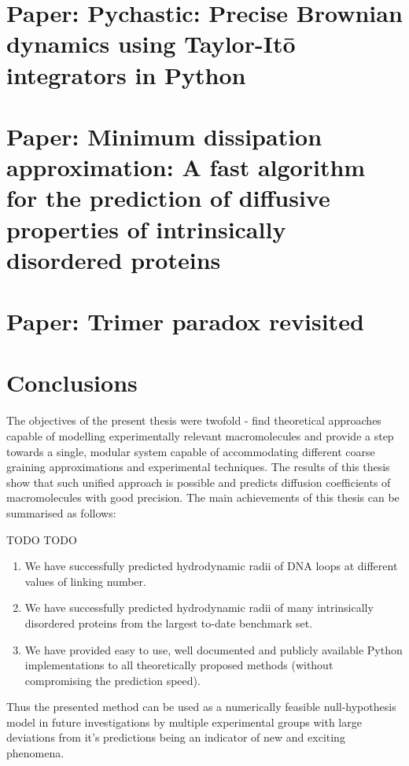 \documentclass{doctoral}
\begin{document}
\chapter{Paper: Pychastic: Precise Brownian dynamics using Taylor-Itō integrators in Python}


\chapter{Paper: Minimum dissipation approximation: A fast algorithm for the prediction of diffusive properties of intrinsically disordered proteins}


\chapter{Paper: Trimer paradox revisited}
%

\chapter{Conclusions}

The objectives of the present thesis were twofold - find theoretical approaches capable of modelling experimentally relevant macromolecules and provide a step towards a single, modular system capable of accommodating different coarse graining approximations and experimental techniques. The results of this thesis show that such unified approach is possible and predicts diffusion coefficients of macromolecules with good precision. The main achievements of this thesis can be summarised as follows:

TODO TODO
\begin{enumerate}
    \item We have successfully predicted hydrodynamic radii of DNA loops at different values of linking number.
    \item We have successfully predicted hydrodynamic radii of many intrinsically disordered proteins from the largest to-date benchmark set.
    \item We have provided easy to use, well documented and publicly available Python implementations to all theoretically proposed methods (without compromising the prediction speed). 
\end{enumerate}
    
Thus the presented method can be used as a numerically feasible null-hypothesis model in future investigations by multiple experimental groups with large deviations from it's predictions being an indicator of new and exciting phenomena. 


\printbibliography[heading=bibchapter]
\end{document}
